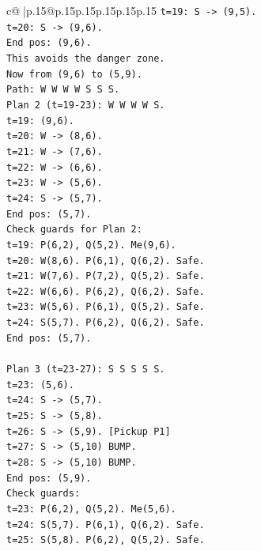 \documentclass{article}
\begin{document}
{\begin{supertabular}{c@{$\;$}|p{.15\linewidth}@{}p{.15\linewidth}p{.15\linewidth}p{.15\linewidth}p{.15\linewidth}p{.15\linewidth}}
{{{\texttt{t=19: S {-}> (9,5).} \\
\texttt{t=20: S {-}> (9,6).} \\
\texttt{End pos: (9,6).} \\
\texttt{This avoids the danger zone.} \\
\texttt{Now from (9,6) to (5,9).} \\
\texttt{Path: W W W W S S S.} \\
\texttt{Plan 2 (t=19{-}23): W W W W S.} \\
\texttt{t=19: (9,6).} \\
\texttt{t=20: W {-}> (8,6).} \\
\texttt{t=21: W {-}> (7,6).} \\
\texttt{t=22: W {-}> (6,6).} \\
\texttt{t=23: W {-}> (5,6).} \\
\texttt{t=24: S {-}> (5,7).} \\
\texttt{End pos: (5,7).} \\
\texttt{Check guards for Plan 2:} \\
\texttt{t=19: P(6,2), Q(5,2). Me(9,6).} \\
\texttt{t=20: W(8,6). P(6,1), Q(6,2). Safe.} \\
\texttt{t=21: W(7,6). P(7,2), Q(5,2). Safe.} \\
\texttt{t=22: W(6,6). P(6,2), Q(6,2). Safe.} \\
\texttt{t=23: W(5,6). P(6,1), Q(5,2). Safe.} \\
\texttt{t=24: S(5,7). P(6,2), Q(6,2). Safe.} \\
\texttt{End pos: (5,7).} \\
\\ 
\texttt{Plan 3 (t=23{-}27): S S S S S.} \\
\texttt{t=23: (5,6).} \\
\texttt{t=24: S {-}> (5,7).} \\
\texttt{t=25: S {-}> (5,8).} \\
\texttt{t=26: S {-}> (5,9). {[}Pickup P1{]}} \\
\texttt{t=27: S {-}> (5,10) BUMP.} \\
\texttt{t=28: S {-}> (5,10) BUMP.} \\
\texttt{End pos: (5,9).} \\
\texttt{Check guards:} \\
\texttt{t=23: P(6,2), Q(5,2). Me(5,6).} \\
\texttt{t=24: S(5,7). P(6,1), Q(6,2). Safe.} \\
\texttt{t=25: S(5,8). P(6,2), Q(5,2). Safe.} \\
}}}
\end{supertabular}}
\end{document}
